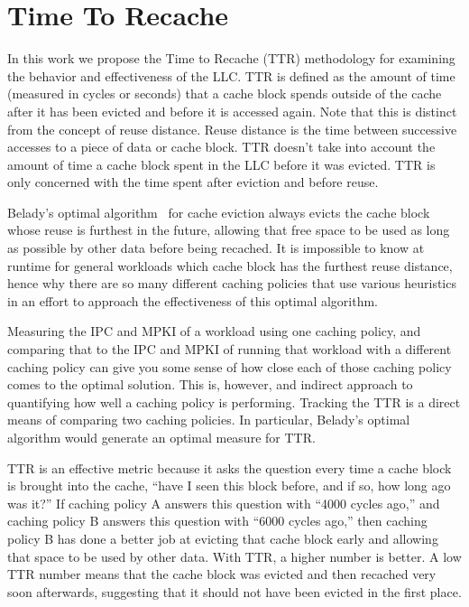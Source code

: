 \section{Time To Recache}

In this work we propose the Time to Recache (TTR) methodology for
examining the behavior and effectiveness of the LLC.  TTR is defined
as the amount of time (measured in cycles or seconds) that a cache
block spends outside of the cache after it has been evicted and
before it is accessed again.  Note that this is distinct from the
concept of reuse distance.  Reuse distance is the time between
successive accesses to a piece of data or cache block.  TTR doesn't
take into account the amount of time a cache block spent in the LLC
before it was evicted.  TTR is only concerned with the time spent
after eviction and before reuse.

Belady's optimal algorithm~\cite{belady66} for cache eviction always evicts
the cache block whose reuse is furthest in the future, allowing that
free space to be used as long as possible by other data before being
recached.  It is impossible to know at runtime for general workloads
which cache block has the furthest reuse distance, hence why there are
so many different caching policies that use various heuristics in an
effort to approach the effectiveness of this optimal algorithm.

Measuring the IPC and MPKI of a workload using one caching policy, and
comparing that to the IPC and MPKI of running that workload with a
different caching policy can give you some sense of how close each of
those caching policy comes to the optimal solution.  This is,
however, and indirect approach to quantifying how well a caching
policy is performing.  Tracking the TTR is a direct means of
comparing two caching policies.
In particular, Belady's optimal algorithm would generate an optimal
measure for TTR.

TTR is an effective metric because it asks the question every time a
cache block is brought into the cache, ``have I seen this block
before, and if so, how long ago was it?''  If caching policy A answers
this question with ``4000 cycles ago,'' and caching policy B answers
this question with ``6000 cycles ago,'' then caching policy B has done
a better job at evicting that cache block early and allowing that
space to be used by other data.  With TTR, a higher number is better.
A low TTR number means that the cache block was evicted and then
recached very soon afterwards, suggesting that it should not have
been evicted in the first place.

